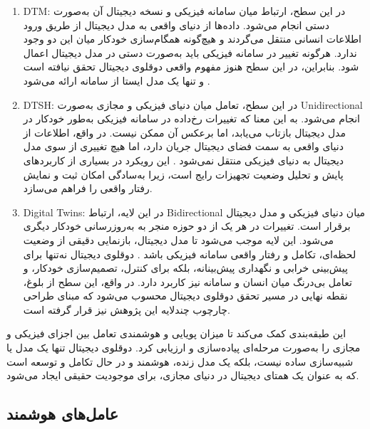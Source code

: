 \documentclass[a4paper,fleqn]{report}
\begin{document}
\begin{enumerate}
\item 
\gls{DTM}:
در این سطح، ارتباط میان سامانه فیزیکی و نسخه دیجیتال آن به‌صورت دستی انجام می‌شود. داده‌ها از دنیای واقعی به مدل دیجیتال از طریق ورود اطلاعات انسانی منتقل می‌گردند و هیچ‌گونه همگام‌سازی خودکار میان این دو وجود ندارد. هرگونه تغییر در سامانه فیزیکی باید به‌صورت دستی در مدل دیجیتال اعمال شود. بنابراین، در این سطح هنوز مفهوم واقعی دوقلوی دیجیتال تحقق نیافته است و تنها یک مدل ایستا از سامانه ارائه می‌شود \cite{tao2019digital}.

\item 
\gls{DTSH}:
در این سطح، تعامل میان دنیای فیزیکی و مجازی به‌صورت \gls{Unidirectional} انجام می‌شود. به این معنا که تغییرات رخ‌داده در سامانه فیزیکی به‌طور خودکار در مدل دیجیتال بازتاب می‌یابد، اما برعکس آن ممکن نیست. در واقع، اطلاعات از دنیای واقعی به سمت فضای دیجیتال جریان دارد، اما هیچ تغییری از سوی مدل دیجیتال به دنیای فیزیکی منتقل نمی‌شود \cite{qi2021enabling,barricelli2019survey}.  
این رویکرد در بسیاری از کاربردهای پایش و تحلیل وضعیت تجهیزات رایج است، زیرا به‌سادگی امکان ثبت و نمایش رفتار واقعی را فراهم می‌سازد.

\item 
\gls{Digital Twins}:
در این لایه، ارتباط \gls{Bidirectional} میان دنیای فیزیکی و مدل دیجیتال برقرار است. تغییرات در هر یک از دو حوزه منجر به به‌روزرسانی خودکار دیگری می‌شود. این لایه موجب می‌شود تا مدل دیجیتال، بازنمایی دقیقی از وضعیت لحظه‌ای، تکامل و رفتار واقعی سامانه فیزیکی باشد \cite{tao2018digital,fuller2020digital,wang2024comprehensive}.  
دوقلوی دیجیتال نه‌تنها برای پیش‌بینی خرابی و نگهداری پیش‌بینانه، بلکه برای کنترل، تصمیم‌سازی خودکار، و تعامل بی‌درنگ میان انسان و سامانه نیز کاربرد دارد. در واقع، این سطح از بلوغ، نقطه نهایی در مسیر تحقق دوقلوی دیجیتال محسوب می‌شود که مبنای طراحی چارچوب چندلایه این پژوهش نیز قرار گرفته است.
\end{enumerate}

 
این طبقه‌بندی کمک می‌کند تا میزان پویایی و هوشمندی تعامل بین اجزای فیزیکی و مجازی را به‌صورت مرحله‌ای پیاده‌سازی و ارزیابی کرد. دوقلوی دیجیتال تنها یک مدل یا شبیه‌سازی ساده نیست، بلکه یک مدل زنده،‌ هوشمند و در حال تکامل و توسعه است که به عنوان یک همتای دیجیتال در دنیای مجازی، برای موجودیت حقیقی ایجاد می‌شود.




\subsection{عامل‌های هوشمند}
\end{document}
